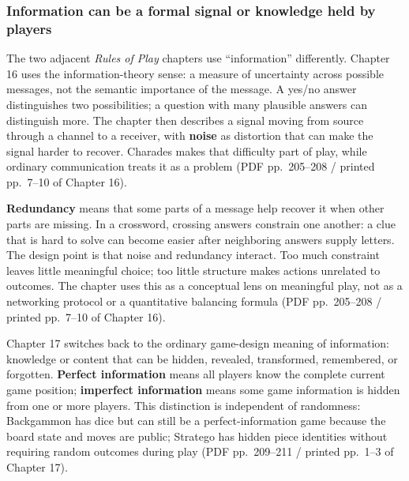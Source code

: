 \subsubsection{Information can be a formal signal or knowledge held by players}\label{05-engine-i-ch009-information-can-be-a-formal-signal-or-knowledge-held-by-players}

\hypertarget{05-engine-i-ch009-information-can-be-a-formal-signal-or-knowledge-held-by-players}{}

The two adjacent \emph{Rules of Play} chapters use ``information'' differently. Chapter 16 uses the information-theory sense: a measure of uncertainty across possible messages, not the semantic importance of the message. A yes/no answer distinguishes two possibilities; a question with many plausible answers can distinguish more. The chapter then describes a signal moving from source through a channel to a receiver, with \textbf{noise} as distortion that can make the signal harder to recover. Charades makes that difficulty part of play, while ordinary communication treats it as a problem (PDF pp.~205--208 / printed pp.~7--10 of Chapter 16).

\textbf{Redundancy} means that some parts of a message help recover it when other parts are missing. In a crossword, crossing answers constrain one another: a clue that is hard to solve can become easier after neighboring answers supply letters. The design point is that noise and redundancy interact. Too much constraint leaves little meaningful choice; too little structure makes actions unrelated to outcomes. The chapter uses this as a conceptual lens on meaningful play, not as a networking protocol or a quantitative balancing formula (PDF pp.~205--208 / printed pp.~7--10 of Chapter 16).

Chapter 17 switches back to the ordinary game-design meaning of information: knowledge or content that can be hidden, revealed, transformed, remembered, or forgotten. \textbf{Perfect information} means all players know the complete current game position; \textbf{imperfect information} means some game information is hidden from one or more players. This distinction is independent of randomness: Backgammon has dice but can still be a perfect-information game because the board state and moves are public; Stratego has hidden piece identities without requiring random outcomes during play (PDF pp.~209--211 / printed pp.~1--3 of Chapter 17).

